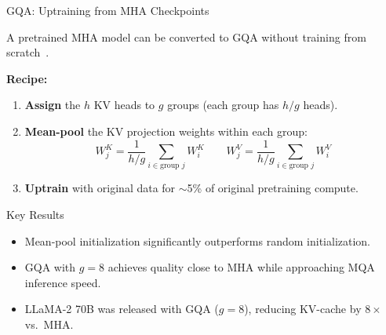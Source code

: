 \begin{frame}{GQA: Uptraining from MHA Checkpoints}

  A pretrained MHA model can be converted to GQA without training from scratch~\cite{ainslie2023gqa}.

  \vspace{0.3em}
  \textbf{Recipe:}
  \begin{enumerate}
    \item \textbf{Assign} the $h$ KV heads to $g$ groups (each group has $h/g$ heads).
    \item \textbf{Mean-pool} the KV projection weights within each group:
    \[
      W_j^K = \frac{1}{h/g} \sum_{i \in \text{group } j} W_i^K
      \qquad
      W_j^V = \frac{1}{h/g} \sum_{i \in \text{group } j} W_i^V
    \]
    \item \textbf{Uptrain} with original data for $\sim$5\% of original pretraining compute.
  \end{enumerate}

  \vspace{0.3em}
  \begin{alertblock}{\small Key Results}
    \begin{itemize}
      \item Mean-pool initialization significantly outperforms random initialization.
      \item GQA with $g = 8$ achieves quality close to MHA while approaching MQA inference speed.
      \item LLaMA-2 70B was released with GQA ($g=8$), reducing KV-cache by $8\times$ vs.\ MHA.
    \end{itemize}
  \end{alertblock}

\end{frame}

